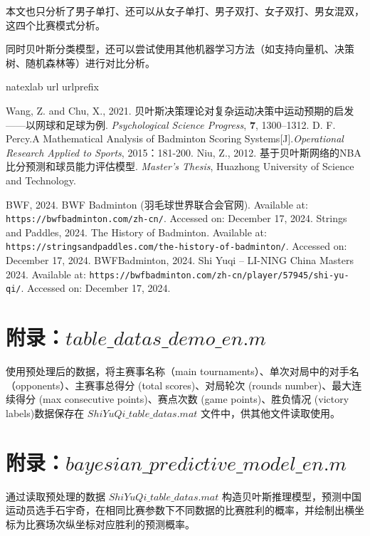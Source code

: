 \documentclass[12pt]{article}
\begin{document}
本文也只分析了男子单打、还可以从女子单打、男子双打、女子双打、男女混双，这四个比赛模式分析。

同时贝叶斯分类模型，还可以尝试使用其他机器学习方法（如支持向量机、决策树、随机森林等）进行对比分析。


\begin{thebibliography}{100}
	\expandafter\ifx\csname natexlab\endcsname\relax\def\natexlab#1{#1}\fi
	\expandafter\ifx\csname url\endcsname\relax
	\def\url#1{\texttt{#1}}\fi
	\expandafter\ifx\csname urlprefix\endcsname\relax\def\urlprefix{URL }\fi

Wang, Z. and Chu, X., 2021. 贝叶斯决策理论对复杂运动决策中运动预期的启发——以网球和足球为例. \textit{Psychological Science Progress}, \textbf{7}, 1300–1312.
D. F. Percy.A Mathematical Analysis of Badminton Scoring Systems[J].\textit{Operational Research Applied to Sports}, 2015：181-200.
Niu, Z., 2012. 基于贝叶斯网络的NBA比分预测和球员能力评估模型. \textit{Master's Thesis}, Huazhong University of Science and Technology.


BWF, 2024. BWF Badminton (羽毛球世界联合会官网). Available at: \url{https://bwfbadminton.com/zh-cn/}. Accessed on: December 17, 2024.
Strings and Paddles, 2024. The History of Badminton. Available at: \url{https://stringsandpaddles.com/the-history-of-badminton/}. Accessed on: December 17, 2024.
BWFBadminton, 2024. Shi Yuqi – LI-NING China Masters 2024. Available at: \url{https://bwfbadminton.com/zh-cn/player/57945/shi-yu-qi/}. Accessed on: December 17, 2024.

\end{thebibliography}

\appendix
\section{附录：$table\_datas\_demo\_en.m$}
使用预处理后的数据，将主赛事名称（main tournaments）、单次对局中的对手名（opponents）、主赛事总得分 (total scores)、对局轮次 (rounds number)、最大连续得分 (max consecutive points)、赛点次数 (game points)、胜负情况 (victory labels)数据保存在 $ShiYuQi\_table\_datas.mat$ 文件中，供其他文件读取使用。




\section{附录：$bayesian\_predictive\_model\_en.m$}
通过读取预处理的数据 $ShiYuQi\_table\_datas.mat$ 构造贝叶斯推理模型，预测中国运动员选手石宇奇，在相同比赛参数下不同数据的比赛胜利的概率，并绘制出横坐标为比赛场次纵坐标对应胜利的预测概率。


\end{document}
